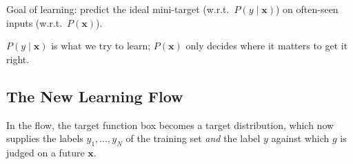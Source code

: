 \begin{moral}
    Goal of learning: predict the ideal mini-target (w.r.t.\ \(P(y \mid
    \bm{x})\)) on often-seen inputs (w.r.t.\ \(P(\bm{x})\)).
\end{moral}

\(P(y \mid \bm{x})\) is what we try to learn; \(P(\bm{x})\) only decides where
it matters to get it right.

\subsection{The New Learning Flow}

In the flow, the target function box becomes a target distribution, which now
supplies the labels \(y_1, \dots , y_N\) of the training set \emph{and} the
label \(y\) against which \(g\) is judged on a future \(\bm{x}\).

